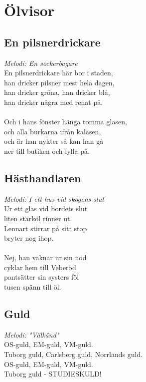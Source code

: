 \chapter{Ölvisor}
\section{En pilsnerdrickare}
\textit{Melodi: En sockerbagare}
\vspace{2mm}\\
En pilsnerdrickare här bor i staden,\\
han dricker pilsner mest hela dagen,\\
han dricker gröna, han dricker blå,\\
han dricker några med renat på.\\
\\
Och i hans fönster hänga tomma glasen,\\
och alla burkarna ifrån kalasen,\\
och är han nykter så kan han gå\\
ner till butiken och fylla på.\\

\section{Hästhandlaren}
\textit{Melodi: I ett hus vid skogens slut}
\vspace{2mm}\\
Ur ett glas vid bordets slut\\
liten starköl rinner ut.\\
Lennart stirrar på sitt stop\\
bryter nog ihop.\\
\\
Nej, han vaknar ur sin nöd\\
cyklar hem till Veberöd\\
pantsätter sin systers föl\\
tusen spänn till öl.\\

\section{Guld}
\textit{Melodi: "Välkänd"}
\vspace{2mm}\\
OS-guld, EM-guld, VM-guld.\\
Tuborg guld, Carlsberg guld, Norrlands guld.\\
OS-guld, EM-guld, VM-guld.\\
Tuborg guld - STUDIESKULD!\\

